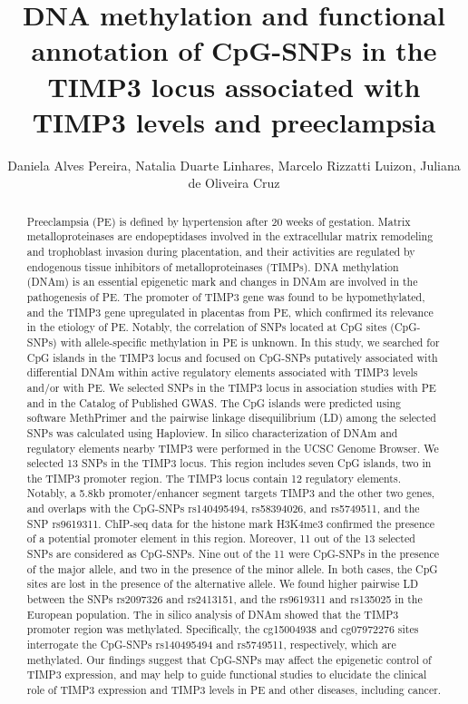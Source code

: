 \documentclass[twoside]{article}
\title{\vspace{-15mm}\fontsize{24pt}{10pt}\selectfont\textbf{ DNA methylation and functional annotation of CpG-SNPs in the TIMP3 locus associated with TIMP3 levels and preeclampsia }} %
\author{ Daniela Alves Pereira,  Natalia Duarte Linhares,  Marcelo Rizzatti Luizon,  Juliana de Oliveira Cruz }
\affil{ Ufmg- Universidade Federal de Minas Gerais,  UNIVERSIDADE FEDERAL DE MINAS GERAIS }
\date{}
\begin{document}
  
  
  \maketitle %
  
  
  \thispagestyle{fancy} %
  
  
  \begin{abstract}
  Preeclampsia (PE) is defined by hypertension after 20 weeks of gestation. Matrix metalloproteinases are endopeptidases involved in the extracellular matrix remodeling and trophoblast invasion during placentation,  and their activities are regulated by endogenous tissue inhibitors of metalloproteinases (TIMPs). DNA methylation (DNAm) is an essential epigenetic mark and changes in DNAm are involved in the pathogenesis of PE. The promoter of TIMP3 gene was found to be hypomethylated,  and the TIMP3 gene upregulated in placentas from PE,  which confirmed its relevance in the etiology of PE. Notably,  the correlation of SNPs located at CpG sites (CpG-SNPs) with allele-specific methylation in PE is unknown. In this study,  we searched for CpG islands in the TIMP3 locus and focused on CpG-SNPs putatively associated with differential DNAm within active regulatory elements associated with TIMP3 levels and/or with PE. We selected SNPs in the TIMP3 locus in association studies with PE and in the Catalog of Published GWAS. The CpG islands were predicted using software MethPrimer and the pairwise linkage disequilibrium (LD) among the selected SNPs was calculated using Haploview. In silico characterization of DNAm and regulatory elements nearby TIMP3 were performed in the UCSC Genome Browser. We selected 13 SNPs in the TIMP3 locus. This region includes seven CpG islands,  two in the TIMP3 promoter region. The TIMP3 locus contain 12 regulatory elements. Notably,  a 5.8kb promoter/enhancer segment targets TIMP3 and the other two genes,  and overlaps with the CpG-SNPs rs140495494,  rs58394026,  and rs5749511,  and the SNP rs9619311. ChIP-seq data for the histone mark H3K4me3 confirmed the presence of a potential promoter element in this region. Moreover,  11 out of the 13 selected SNPs are considered as CpG-SNPs. Nine out of the 11 were CpG-SNPs in the presence of the major allele,  and two in the presence of the minor allele. In both cases,  the CpG sites are lost in the presence of the alternative allele. We found higher pairwise LD between the SNPs rs2097326 and rs2413151,  and the rs9619311 and rs135025 in the European population. The in silico analysis of DNAm showed that the TIMP3 promoter region was methylated. Specifically,  the cg15004938 and cg07972276 sites interrogate the CpG-SNPs rs140495494 and rs5749511,  respectively,  which are methylated. Our findings suggest that CpG-SNPs may affect the epigenetic control of TIMP3 expression,  and may help to guide functional studies to elucidate the clinical role of TIMP3 expression and TIMP3 levels in PE and other diseases,  including cancer.
  

\end{abstract}
\end{document}
